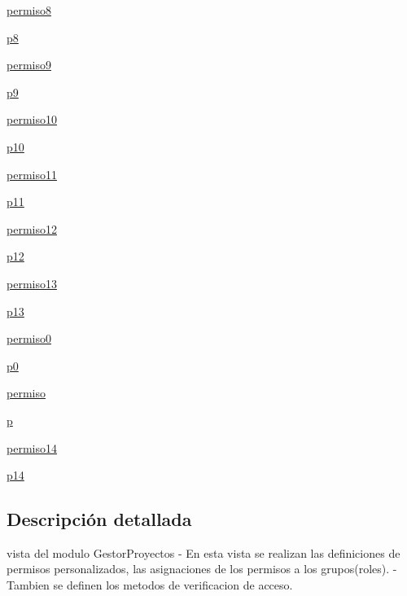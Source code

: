 \begin{DoxyCompactItemize}
\item 
\hyperlink{namespace_gestor_proyectos_1_1views_a9e8e0e4a77ad7da3362360a4f5d3ef37}{permiso8}
\item 
\hyperlink{namespace_gestor_proyectos_1_1views_a5a392cc2481d7be7838e1a153420e366}{p8}
\item 
\hyperlink{namespace_gestor_proyectos_1_1views_a3b831cdeb389c07f730d420ac06147e6}{permiso9}
\item 
\hyperlink{namespace_gestor_proyectos_1_1views_adc255a0b01a63f9081d7226371c61450}{p9}
\item 
\hyperlink{namespace_gestor_proyectos_1_1views_a94f94d2c271746b3906883b9f6204f37}{permiso10}
\item 
\hyperlink{namespace_gestor_proyectos_1_1views_aece96142829bc04861377d1018e41639}{p10}
\item 
\hyperlink{namespace_gestor_proyectos_1_1views_a6cd03223f6f55004c2ae6ae0f7914b42}{permiso11}
\item 
\hyperlink{namespace_gestor_proyectos_1_1views_a09878cf48b6ee6df7442a07dbb03cccd}{p11}
\item 
\hyperlink{namespace_gestor_proyectos_1_1views_a0728896412cf2c508d87ce58c7ded102}{permiso12}
\item 
\hyperlink{namespace_gestor_proyectos_1_1views_af928701fb79adec6dd935f0babf5a6ed}{p12}
\item 
\hyperlink{namespace_gestor_proyectos_1_1views_a14b364a8fb0c75d8981736cb607c48e1}{permiso13}
\item 
\hyperlink{namespace_gestor_proyectos_1_1views_ad95d16d70954c2f1bb3bd2f4fedfd831}{p13}
\item 
\hyperlink{namespace_gestor_proyectos_1_1views_a2e44b76ea1d85300d5f2baf1b40e4977}{permiso0}
\item 
\hyperlink{namespace_gestor_proyectos_1_1views_add510303e98c7c300be0f3ef06ee8198}{p0}
\item 
\hyperlink{namespace_gestor_proyectos_1_1views_a993fee8dc7bf34ed9ea67c5e4a860dc9}{permiso}
\item 
\hyperlink{namespace_gestor_proyectos_1_1views_a13b1f36c44af8199aa00712c2eb71389}{p}
\item 
\hyperlink{namespace_gestor_proyectos_1_1views_acc45d77f3122ed0497384a523029f503}{permiso14}
\item 
\hyperlink{namespace_gestor_proyectos_1_1views_aab5eb0361c48c88c343bf729fac64185}{p14}
\end{DoxyCompactItemize}


\subsection{Descripción detallada}
\begin{DoxyVerb}vista del modulo GestorProyectos
- En esta vista se realizan las definiciones de permisos personalizados, las asignaciones de los permisos a los grupos(roles).
- Tambien se definen los metodos de verificacion de acceso.
\end{DoxyVerb}
 

